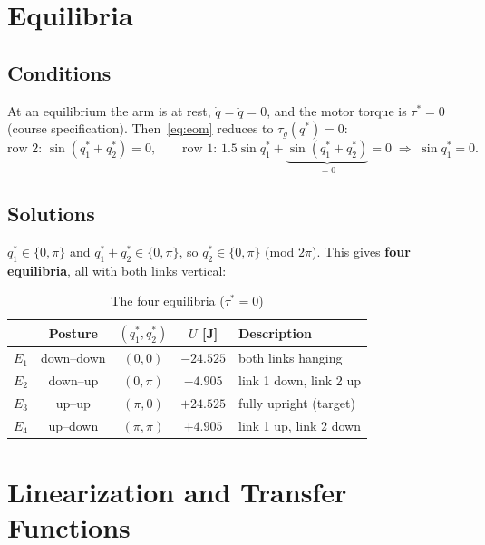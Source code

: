 \documentclass[12pt,a4paper]{article}
\begin{document}
\section{Equilibria}\label{sec:eq}
\subsection{Conditions}
At an equilibrium the arm is at rest, $\dot q=\ddot q=0$, and the motor torque is $\tau^*=0$ (course specification). Then~\eqref{eq:eom} reduces to $\tau_g(q^*)=0$:
\begin{equation*}
\text{row 2: }\sin(q_1^*+q_2^*)=0,\qquad
\text{row 1: }1.5\sin q_1^*+\underbrace{\sin(q_1^*+q_2^*)}_{=0}=0\;\Rightarrow\;\sin q_1^*=0 .
\end{equation*}
\subsection{Solutions}
$q_1^*\in\{0,\pi\}$ and $q_1^*+q_2^*\in\{0,\pi\}$, so $q_2^*\in\{0,\pi\}$ (mod $2\pi$). This gives \textbf{four equilibria}, all with both links vertical:
\begin{table}[H]
\centering
\caption{The four equilibria ($\tau^*=0$)}
\label{tab:eq}
\begin{tabular}{|c|c|c|c|l|}
\hline
 & Posture & $(q_1^*,q_2^*)$ & $U$ [J] & Description\\ \hline
$E_1$ & down--down & $(0,0)$ & $-24.525$ & both links hanging\\
$E_2$ & down--up & $(0,\pi)$ & $-4.905$ & link 1 down, link 2 up\\
$E_3$ & up--up & $(\pi,0)$ & $+24.525$ & fully upright (target)\\
$E_4$ & up--down & $(\pi,\pi)$ & $+4.905$ & link 1 up, link 2 down\\ \hline
\end{tabular}
\end{table}

\section{Linearization and Transfer Functions}\label{sec:lin}
\end{document}
